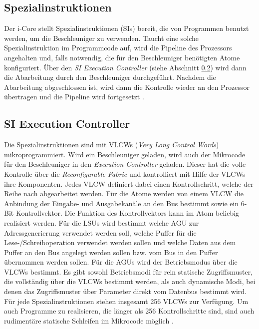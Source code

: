 \subsection{Spezialinstruktionen}
\label{sec:special_instruction}
Der i-Core stellt Spezialinstruktionen (SIs) bereit, die von Programmen benutzt werden, um die Beschleuniger zu verwenden.
Taucht eine solche Spezialinstruktion im Programmcode auf, wird die Pipeline des Prozessors angehalten und, falls notwendig,
die für den Beschleuniger benötigten Atome konfiguriert. Über den \textit{SI Execution Controller} (siehe Abschnitt \ref{sec:si_exec_ctl})
wird dann die Abarbeitung durch den Beschleuniger durchgeführt. Nachdem die Abarbeitung abgeschlossen ist, wird dann die Kontrolle wieder an den Prozessor übertragen
und die Pipeline wird fortgesetzt \cite{riedlberger2013}.

\subsection{SI Execution Controller}
\label{sec:si_exec_ctl}
Die Spezialinstruktionen sind mit VLCWs (\textit{Very Long Control Words}) mikroprogrammiert. Wird ein Beschleuniger geladen,
wird auch der Mikrocode für den Beschleuniger in den \textit{Execution Controller} geladen. Dieser hat die volle Kontrolle über die
\textit{Reconfigurable Fabric} und kontrolliert mit Hilfe der VLCWs ihre Komponenten. Jedes VLCW definiert dabei einen Kontrollschritt,
welche der Reihe nach abgearbeitet werden. Für die Atome werden von einem VLCW die Anbindung der Eingabe- und Ausgabekanäle an den Bus
bestimmt sowie ein 6-Bit Kontrollvektor. Die Funktion des Kontrollvektors kann im Atom beliebig realisiert werden. Für die LSUs wird bestimmt
welche AGU zur Adressgenerierung verwendet werden soll, welche Puffer für die Lese-/Schreiboperation verwendet werden sollen und
welche Daten aus dem Puffer an den Bus angelegt werden sollen bzw. vom Bus in den Puffer übernommen werden sollen.
Für die AGUs wird der Betriebsmodus über die VLCWs bestimmt. Es gibt sowohl Betriebsmodi für rein statische Zugriffsmuster,
die vollständig über die VLCWs bestimmt werden, als auch dynamische Modi, bei denen das Zugriffsmuster über Parameter direkt vom Datenbus bestimmt wird.
Für jede Spezialinstruktionen stehen insgesamt 256 VLCWs zur Verfügung. Um auch Programme zu realisieren,
die länger als 256 Kontrollschritte sind, sind auch rudimentäre statische Schleifen im Mikrocode möglich \cite{riedlberger2013}.

